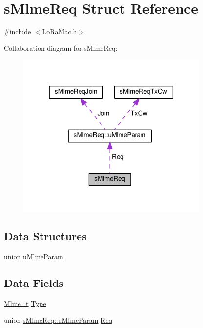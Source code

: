 \hypertarget{structsMlmeReq}{}\section{s\+Mlme\+Req Struct Reference}
\label{structsMlmeReq}


{\ttfamily \#include $<$Lo\+Ra\+Mac.\+h$>$}



Collaboration diagram for s\+Mlme\+Req\+:
\nopagebreak
\begin{figure}[H]
\begin{center}
\leavevmode
\includegraphics[width=270pt]{structsMlmeReq__coll__graph}
\end{center}
\end{figure}
\subsection*{Data Structures}
\begin{DoxyCompactItemize}
\item 
union \hyperlink{unionsMlmeReq_1_1uMlmeParam}{u\+Mlme\+Param}
\end{DoxyCompactItemize}
\subsection*{Data Fields}
\begin{DoxyCompactItemize}
\item 
\hyperlink{group__LORAMAC_ga663544b83d50ec3518608be495896809}{Mlme\+\_\+t} \hyperlink{structsMlmeReq_ab7870d559ad9c5a08d305220bf798cd3}{Type}
\item 
union \hyperlink{unionsMlmeReq_1_1uMlmeParam}{s\+Mlme\+Req\+::u\+Mlme\+Param} \hyperlink{structsMlmeReq_a6f57f62db1981b24980a7745b966a469}{Req}
\end{DoxyCompactItemize}


